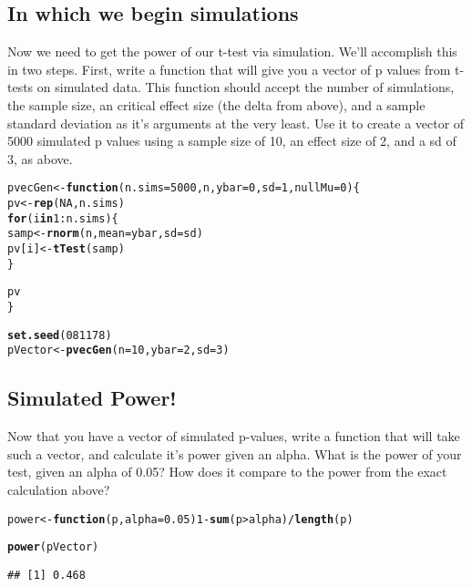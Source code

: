 \documentclass{article}\usepackage[]{graphicx}\usepackage[]{color}
\makeatletter
\newcommand{\hlnum}[1]{\textcolor[rgb]{0.686,0.059,0.569}{#1}}%
\newcommand{\hlopt}[1]{\textcolor[rgb]{0,0,0}{#1}}%
\newcommand{\hlstd}[1]{\textcolor[rgb]{0.345,0.345,0.345}{#1}}%
\newcommand{\hlkwa}[1]{\textcolor[rgb]{0.161,0.373,0.58}{\textbf{#1}}}%
\newcommand{\hlkwb}[1]{\textcolor[rgb]{0.69,0.353,0.396}{#1}}%
\newcommand{\hlkwc}[1]{\textcolor[rgb]{0.333,0.667,0.333}{#1}}%
\newcommand{\hlkwd}[1]{\textcolor[rgb]{0.737,0.353,0.396}{\textbf{#1}}}%
\newenvironment{kframe}{%
 \def\at@end@of@kframe{}%
 \ifinner\ifhmode%
  \def\at@end@of@kframe{\end{minipage}}%
  \begin{minipage}{\columnwidth}%
 \fi\fi%
 \def\FrameCommand##1{\hskip\@totalleftmargin \hskip-\fboxsep
 \colorbox{shadecolor}{##1}\hskip-\fboxsep
     \hskip-\linewidth \hskip-\@totalleftmargin \hskip\columnwidth}%
 \MakeFramed {\advance\hsize-\width
   \@totalleftmargin\z@ \linewidth\hsize
   \@setminipage}}%
 {\par\unskip\endMakeFramed%
 \at@end@of@kframe}
\newenvironment{knitrout}{}{} %
\makeatother
\begin{document}
\subsection{In which we begin simulations}
Now we need to get the power of our t-test via simulation.  We'll accomplish this in two steps.  First, write a function that will give you a vector of p values from t-tests on simulated data.  This function should accept the number of simulations, the sample size, an critical effect size (the delta from above), and a sample standard deviation as it's arguments at the very least.  Use it to create a vector of  5000 simulated p values using a sample size of 10, an effect size of 2, and a sd of 3, as above.
\begin{knitrout}
\color{fgcolor}\begin{kframe}
\begin{alltt}
\hlstd{pvecGen} \hlkwb{<-} \hlkwa{function}\hlstd{(}\hlkwc{n.sims}\hlstd{=}\hlnum{5000}\hlstd{,} \hlkwc{n}\hlstd{,} \hlkwc{ybar}\hlstd{=}\hlnum{0}\hlstd{,} \hlkwc{sd}\hlstd{=}\hlnum{1}\hlstd{,} \hlkwc{nullMu}\hlstd{=}\hlnum{0}\hlstd{)\{}
  \hlstd{pv} \hlkwb{<-} \hlkwd{rep}\hlstd{(}\hlnum{NA}\hlstd{, n.sims)}
  \hlkwa{for}\hlstd{(i} \hlkwa{in} \hlnum{1}\hlopt{:}\hlstd{n.sims)\{}
    \hlstd{samp}\hlkwb{<-}\hlkwd{rnorm}\hlstd{(n,} \hlkwc{mean} \hlstd{= ybar,} \hlkwc{sd}\hlstd{=sd)}
    \hlstd{pv[i]} \hlkwb{<-} \hlkwd{tTest}\hlstd{(samp)}
  \hlstd{\}}

  \hlstd{pv}
\hlstd{\}}

\hlkwd{set.seed}\hlstd{(}\hlnum{081178}\hlstd{)}
\hlstd{pVector}\hlkwb{<-}\hlkwd{pvecGen}\hlstd{(}\hlkwc{n}\hlstd{=}\hlnum{10}\hlstd{,} \hlkwc{ybar}\hlstd{=}\hlnum{2}\hlstd{,} \hlkwc{sd}\hlstd{=}\hlnum{3}\hlstd{)}
\end{alltt}
\end{kframe}
\end{knitrout}

\subsection{Simulated Power!}
Now that you have a vector of simulated p-values, write a function that will take such a vector, and calculate it's power given an alpha.  What is the power of your test, given an alpha of 0.05?  How does it compare to the power from the exact calculation above?

\begin{knitrout}
\color{fgcolor}\begin{kframe}
\begin{alltt}
\hlstd{power} \hlkwb{<-}\hlkwa{function} \hlstd{(}\hlkwc{p}\hlstd{,} \hlkwc{alpha}\hlstd{=}\hlnum{0.05}\hlstd{)} \hlnum{1}\hlopt{-}\hlkwd{sum}\hlstd{(p} \hlopt{>} \hlstd{alpha)}\hlopt{/}\hlkwd{length}\hlstd{(p)}

\hlkwd{power}\hlstd{(pVector)}
\end{alltt}
\begin{verbatim}
## [1] 0.468
\end{verbatim}
\end{kframe}
\end{knitrout}
\end{document}
